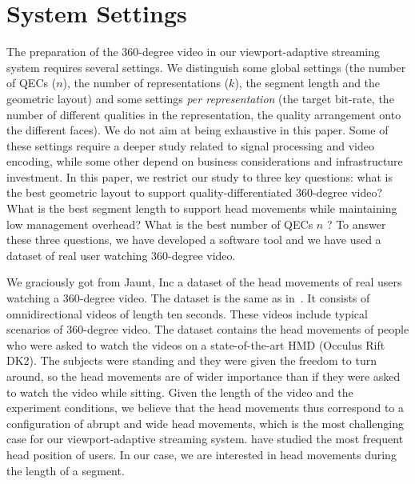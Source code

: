 \newcommand\testBitrateBudget{7}
\section{System Settings}
\label{sec:settings}

The preparation of the 360-degree video in our viewport-adaptive streaming system
requires several settings. We distinguish some global settings (the number of \acp{QEC} ($n$),
the number of representations ($k$), the segment length and the geometric layout)
and some settings \emph{per representation}
(the target bit-rate, the number of different qualities in the representation, the quality
arrangement onto the different
faces). We do not aim
at being exhaustive in this paper. Some of these settings require a deeper study related to
signal processing and video encoding, while some other depend on business considerations and infrastructure investment. In this paper, we restrict our study
to three key questions: what is the best geometric layout to support quality-differentiated 360-degree
video? What is the best segment length to support head movements while maintaining low
management overhead? What is the best number of \acp{QEC} $n$ ? To answer these three questions,
we have developed a software tool and we have used a dataset of real user watching 360-degree
video.


We graciously got from Jaunt, Inc a dataset of the head movements
of real users watching a 360-degree video. The dataset is the same as
in~\cite{yu_framework_2015}. It consists of
 omnidirectional videos of length ten seconds. These videos include
typical scenarios of 360-degree video. The dataset contains
the head movements of  people who were asked to watch the videos on
a state-of-the-art \ac{HMD} (Occulus Rift DK2). The subjects were
standing and they were given the freedom to turn around, so the head
movements are of wider importance than if they were asked to watch the
video while sitting. Given the length of the video and the experiment
conditions, we believe that the head movements thus correspond to a
configuration of abrupt and wide head movements, which is the most
challenging case for our viewport-adaptive streaming system.
\citet{yu_framework_2015} have studied the most frequent head position of users.
In our case, we are interested in head movements during the
length of a segment.

